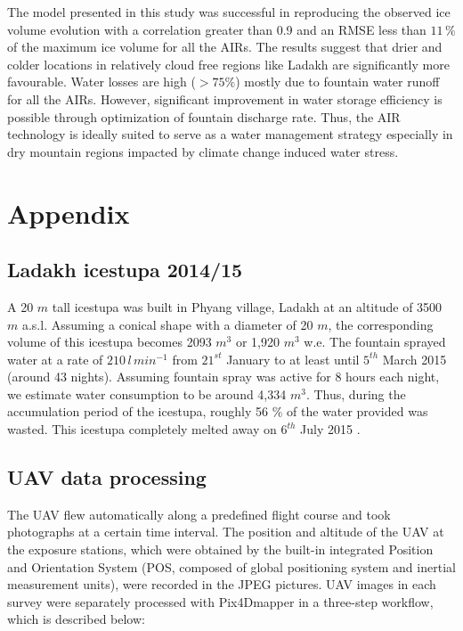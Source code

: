 \documentclass[utf8]{frontiersSCNS} %
\begin{document}
The model presented in this study was successful in reproducing the observed ice volume evolution with a
correlation greater than 0.9 and an RMSE less than $11 \, \%$ of the maximum ice volume for all the AIRs. The
results suggest that drier and colder locations in relatively cloud free regions like Ladakh are significantly
more favourable. Water losses are high ($>75\%$) mostly due to fountain water runoff for all the AIRs. However,
significant improvement in water storage efficiency is possible through optimization of fountain discharge rate.
Thus, the AIR technology is ideally suited to serve as a water management strategy especially in dry mountain
regions impacted by climate change induced water stress.

\section{Appendix}

\subsection{Ladakh icestupa 2014/15} \label{sec:ladakhloss}

A 20 $m$ tall icestupa \citep{iceheight} was built in Phyang village, Ladakh at an altitude of 3500 $m$ a.s.l.
Assuming a conical shape with a diameter of 20 $m$, the corresponding volume of this icestupa becomes 2093 $m^3$ or
1,920 $m^3$ w.e. The fountain sprayed water at a rate of $210\, l\,min^{-1}$ \citep{waterinput} from $21^{st}$
January \citep{waterstart} to at least until $5^{th}$ March 2015 \citep{waterend} (around 43 nights). Assuming
fountain spray was active for 8 hours each night, we estimate water consumption to be around 4,334 $m^3$. Thus,
during the accumulation period of the icestupa, roughly 56 \% of the water provided was wasted.  This icestupa
completely melted away on $6^{th}$ July 2015 \citep{coneends}.

\subsection{UAV data processing} \label{sec:uav}
The UAV flew automatically along a predefined flight course and took photographs at a certain time interval. The
position and altitude of the UAV at the exposure stations, which were obtained by the built-in integrated
Position and Orientation System (POS, composed of global positioning system and inertial measurement units),
were recorded in the JPEG pictures. UAV images in each survey were separately processed with Pix4Dmapper in a
three-step workflow, which is described below:
\end{document}

